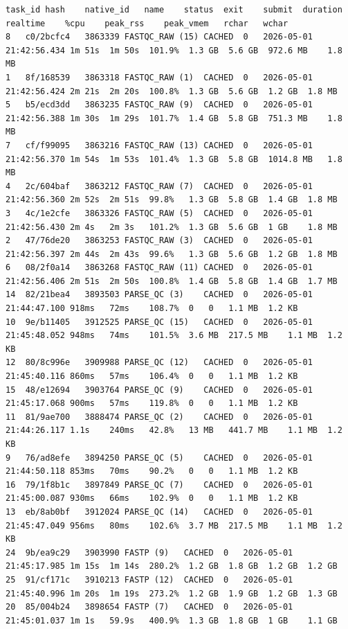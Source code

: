 \documentclass[
  letterpaper,
  DIV=11,
  numbers=noendperiod]{scrartcl}
\begin{document}
\begin{verbatim}
task_id hash    native_id   name    status  exit    submit  duration    realtime    %cpu    peak_rss    peak_vmem   rchar   wchar
8   c0/2bcfc4   3863339 FASTQC_RAW (15) CACHED  0   2026-05-01 21:42:56.434 1m 51s  1m 50s  101.9%  1.3 GB  5.6 GB  972.6 MB    1.8 MB
1   8f/168539   3863318 FASTQC_RAW (1)  CACHED  0   2026-05-01 21:42:56.424 2m 21s  2m 20s  100.8%  1.3 GB  5.6 GB  1.2 GB  1.8 MB
5   b5/ecd3dd   3863235 FASTQC_RAW (9)  CACHED  0   2026-05-01 21:42:56.388 1m 30s  1m 29s  101.7%  1.4 GB  5.8 GB  751.3 MB    1.8 MB
7   cf/f99095   3863216 FASTQC_RAW (13) CACHED  0   2026-05-01 21:42:56.370 1m 54s  1m 53s  101.4%  1.3 GB  5.8 GB  1014.8 MB   1.8 MB
4   2c/604baf   3863212 FASTQC_RAW (7)  CACHED  0   2026-05-01 21:42:56.360 2m 52s  2m 51s  99.8%   1.3 GB  5.8 GB  1.4 GB  1.8 MB
3   4c/1e2cfe   3863326 FASTQC_RAW (5)  CACHED  0   2026-05-01 21:42:56.430 2m 4s   2m 3s   101.2%  1.3 GB  5.6 GB  1 GB    1.8 MB
2   47/76de20   3863253 FASTQC_RAW (3)  CACHED  0   2026-05-01 21:42:56.397 2m 44s  2m 43s  99.6%   1.3 GB  5.6 GB  1.2 GB  1.8 MB
6   08/2f0a14   3863268 FASTQC_RAW (11) CACHED  0   2026-05-01 21:42:56.406 2m 51s  2m 50s  100.8%  1.4 GB  5.8 GB  1.4 GB  1.7 MB
14  82/21bea4   3893503 PARSE_QC (3)    CACHED  0   2026-05-01 21:44:47.100 918ms   72ms    108.7%  0   0   1.1 MB  1.2 KB
10  9e/b11405   3912525 PARSE_QC (15)   CACHED  0   2026-05-01 21:45:48.052 948ms   74ms    101.5%  3.6 MB  217.5 MB    1.1 MB  1.2 KB
12  80/8c996e   3909988 PARSE_QC (12)   CACHED  0   2026-05-01 21:45:40.116 860ms   57ms    106.4%  0   0   1.1 MB  1.2 KB
15  48/e12694   3903764 PARSE_QC (9)    CACHED  0   2026-05-01 21:45:17.068 900ms   57ms    119.8%  0   0   1.1 MB  1.2 KB
11  81/9ae700   3888474 PARSE_QC (2)    CACHED  0   2026-05-01 21:44:26.117 1.1s    240ms   42.8%   13 MB   441.7 MB    1.1 MB  1.2 KB
9   76/ad8efe   3894250 PARSE_QC (5)    CACHED  0   2026-05-01 21:44:50.118 853ms   70ms    90.2%   0   0   1.1 MB  1.2 KB
16  79/1f8b1c   3897849 PARSE_QC (7)    CACHED  0   2026-05-01 21:45:00.087 930ms   66ms    102.9%  0   0   1.1 MB  1.2 KB
13  eb/8ab0bf   3912024 PARSE_QC (14)   CACHED  0   2026-05-01 21:45:47.049 956ms   80ms    102.6%  3.7 MB  217.5 MB    1.1 MB  1.2 KB
24  9b/ea9c29   3903990 FASTP (9)   CACHED  0   2026-05-01 21:45:17.985 1m 15s  1m 14s  280.2%  1.2 GB  1.8 GB  1.2 GB  1.2 GB
25  91/cf171c   3910213 FASTP (12)  CACHED  0   2026-05-01 21:45:40.996 1m 20s  1m 19s  273.2%  1.2 GB  1.9 GB  1.2 GB  1.3 GB
20  85/004b24   3898654 FASTP (7)   CACHED  0   2026-05-01 21:45:01.037 1m 1s   59.9s   400.9%  1.3 GB  1.8 GB  1 GB    1.1 GB

\end{verbatim}
\end{document}

